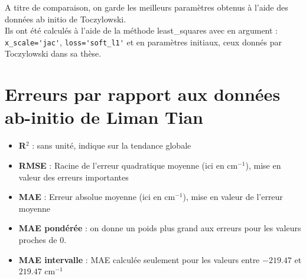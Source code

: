 \documentclass[10pt,a4paper]{article}
\begin{document}
A titre de comparaison, on garde les meilleurs paramètres obtenus à l'aide des
données ab initio de Toczylowski.\\

Ils ont été calculés à l'aide de la méthode least\_squares avec en argument : 
\verb|x_scale='jac'|, \verb|loss='soft_l1'| et en paramètres initiaux, ceux
donnés par Toczylowski dans sa thèse.

\newpage{}
\section{Erreurs par rapport aux données ab-initio de Liman Tian}

\begin{table}[ht]
\centering
\caption{Comparaison des erreurs par méthode}
\label{erreurs}
\end{table}

\begin{itemize}
  \item \textbf{R$^2$} : sans unité, indique sur la tendance globale
  \item \textbf{RMSE} : Racine de l’erreur quadratique moyenne (ici en cm$^{-1}$), mise
    en valeur des erreurs importantes
  \item \textbf{MAE} : Erreur absolue moyenne (ici en cm$^{-1}$), mise en
    valeur de l'erreur moyenne
  \item \textbf{MAE pondérée} : on donne un poids plus grand aux erreurs pour
    les valeurs proches de $0$.
  \item \textbf{MAE intervalle} : MAE calculée seulement pour les valeurs 
    entre $-219.47$ et $219.47$ cm$^{-1}$
\end{itemize}
\end{document}
